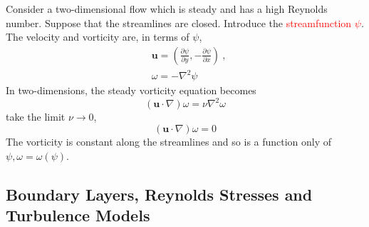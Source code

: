\documentclass[12pt,a4paper]{article}
\renewcommand{\vec}[1]{\boldsymbol{#1}}
\begin{document}
Consider a two-dimensional flow which is steady and has a high Reynolds number. Suppose that the streamlines are closed. Introduce the \textcolor{red}{streamfunction $\psi$}. The velocity and vorticity are, in terms of $\psi$,
\begin{align*}
& \vec{u} = \left(\frac{\partial \psi}{\partial y}, -\frac{\partial \psi}{\partial x} \right) ~, \\
& \omega = -\nabla^2 \psi
\end{align*}
In two-dimensions, the steady vorticity equation becomes
\begin{equation}
(\vec{u} \cdot \nabla) \omega = \nu \nabla^2  \omega 
\end{equation}
take the limit $\nu \rightarrow 0$, 
\begin{equation}
(\vec{u} \cdot \nabla) \omega = 0
\end{equation}
The vorticity is constant along the streamlines and so is a function only of $\psi, \omega = \omega (\psi)$.














































\subsection{Boundary Layers, Reynolds Stresses and Turbulence Models}
\end{document}
